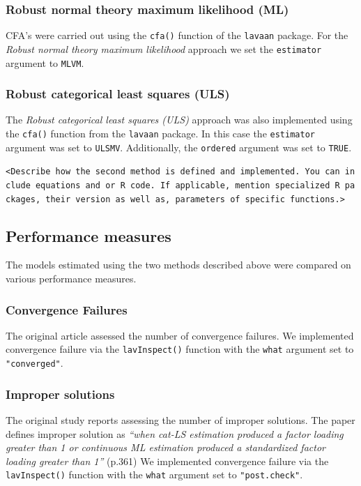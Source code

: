 \documentclass[10,a4paperpaper,]{article}
\begin{document}
\subsubsection{Robust normal theory maximum likelihood (ML)}

CFA's were carried out using the \texttt{cfa()} function of the
\texttt{lavaan} package. For the \emph{Robust normal theory maximum
likelihood} approach we set the \texttt{estimator} argument to
\texttt{MLVM}.

\subsubsection{Robust categorical least squares (ULS)}

The \emph{Robust categorical least squares (ULS)} approach was also
implemented using the \texttt{cfa()} function from the \texttt{lavaan}
package. In this case the \texttt{estimator} argument was set to
\texttt{ULSMV}. Additionally, the \texttt{ordered} argument was set to
\texttt{TRUE}.

\texttt{\textless{}Describe\ how\ the\ second\ method\ is\ defined\ and\ implemented.\ You\ can\ include\ equations\ and\ or\ R\ code.\ If\ applicable,\ mention\ specialized\ R\ packages,\ their\ version\ as\ well\ as,\ parameters\ of\ specific\ functions.\textgreater{}}

\subsection{Performance measures}

The models estimated using the two methods described above were compared
on various performance measures.

\subsubsection{Convergence Failures}

The original article assessed the number of convergence failures. We
implemented convergence failure via the \texttt{lavInspect()} function
with the \texttt{what} argument set to \texttt{"converged"}.

\subsubsection{Improper solutions}

The original study reports assessing the number of improper solutions.
The paper defines improper solution as \emph{``when cat-LS estimation
produced a factor loading greater than 1 or continuous ML estimation
produced a standardized factor loading greater than 1''} (p.361) We
implemented convergence failure via the \texttt{lavInspect()} function
with the \texttt{what} argument set to \texttt{"post.check"}.
\end{document}
